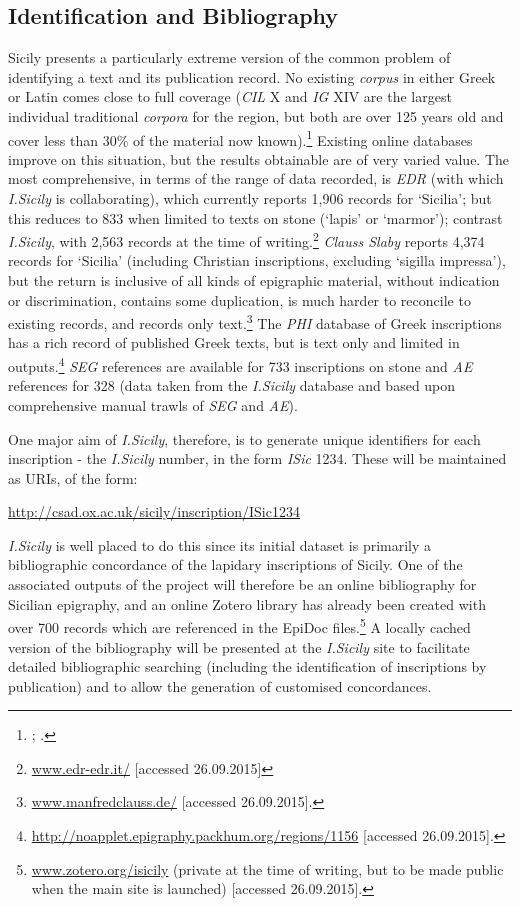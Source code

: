 \documentclass[amsthm,ebook]{saparticle}
\begin{document}
\subsection{Identification and Bibliography}


\noindent Sicily presents a particularly extreme version of the common problem of identifying a text and its publication record.
No existing \emph{corpus} in either Greek or Latin comes close to full coverage (\emph{CIL} X and \emph{IG} XIV are the largest individual
traditional \emph{corpora} for the region, but both are over 125 years old and cover less than 30\% of the material now
known).\footnote{\citet{_inscriptiones_1883}; \citet{kaibel_inscriptiones_1890}.} Existing online databases improve on this situation, but the results
obtainable are of very varied value. The most comprehensive, in terms of the range of data recorded, is \emph{EDR} (with which
\emph{I.Sicily} is collaborating), which currently reports 1,906 records for `Sicilia'; but this reduces to 833 when limited
to texts on stone (`lapis' or `marmor'); contrast \emph{I.Sicily}, with 2,563 records at the time of writing.\footnote{
\url{www.edr-edr.it/} [accessed 26.09.2015]} \emph{Clauss Slaby} reports 4,374 records for `Sicilia' (including Christian
inscriptions, excluding `sigilla impressa'), but the return is inclusive of all kinds of epigraphic material, without
indication or discrimination, contains some duplication, is much harder to reconcile to existing records, and records
only text.\footnote{ \url{www.manfredclauss.de/} [accessed 26.09.2015].} The \emph{PHI} database of Greek inscriptions has a rich
record of published Greek texts, but is text only and limited in outputs.\footnote{
\url{http://noapplet.epigraphy.packhum.org/regions/1156} [accessed 26.09.2015].} \emph{SEG} references are available for 733
inscriptions on stone and \emph{AE} references for 328 (data taken from the \emph{I.Sicily} database and based upon comprehensive
manual trawls of \emph{SEG} and \emph{AE}).

One major aim of \emph{I.Sicily}, therefore, is to generate unique identifiers for each inscription - the \emph{I.Sicily} number, in
the form \emph{ISic} 1234. These will be maintained as URIs, of the form:

\url{http://csad.ox.ac.uk/sicily/inscription/ISic1234}

\emph{I.Sicily} is well placed to do this since its initial dataset is primarily a bibliographic concordance of the lapidary
inscriptions of Sicily. One of the associated outputs of the project will therefore be an online bibliography for
Sicilian epigraphy, and an online Zotero library has already been created with over 700 records which are referenced in
the EpiDoc files.\footnote{\url{www.zotero.org/isicily} (private at the time of writing, but to be made public when the main
site is launched) [accessed 26.09.2015].} A locally cached version of the bibliography will be presented at the
\emph{I.Sicily} site to facilitate detailed bibliographic searching (including the identification of inscriptions by
publication) and to allow the generation of customised concordances.
\end{document}
